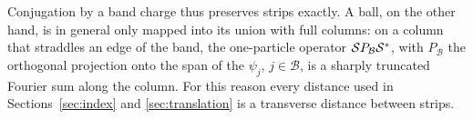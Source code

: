 Conjugation by a band charge thus preserves strips exactly. A ball, on the other hand, is in general only
mapped into its union with full columns: on a column that straddles an edge of the band, the one-particle
operator $\mathcal{S} P_{\mathcal B}\mathcal{S}^*$, with $P_{\mathcal B}$ the orthogonal projection onto the span of the $\psi_j$,
$j\in\mathcal B$, is a sharply truncated Fourier sum along the column. For this reason every distance used in
Sections~\ref{sec:index} and \ref{sec:translation} is a transverse distance between strips.
